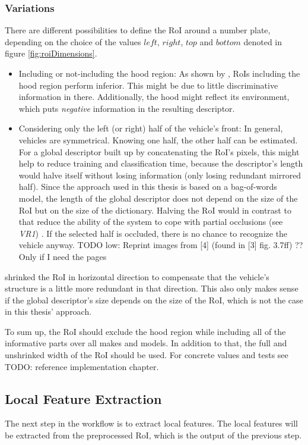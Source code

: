 \subsubsection{Variations}
There are different possibilities to define the RoI around a number plate, depending on the choice of the values $left$, $right$, $top$ and $bottom$ denoted in figure \ref{fig:roiDimensions}.

\begin{itemize}
  \item Including or not-including the hood region: As shown by \citep{hsieh2014symmetrical}, RoIs including the hood region perform inferior. This might be due to little discriminative information in there. Additionally, the hood might reflect its environment, which puts \emph{negative} information in the resulting descriptor.
  \item Considering only the left (or right) half of the vehicle's front: In general, vehicles are symmetrical. Knowing one half, the other half can be estimated. For a global descriptor built up by concatenating the RoI's pixels, this might help to reduce training and classification time, because the descriptor's length would halve itself without losing information (only losing redundant mirrored half). Since the approach used in this thesis is based on a bag-of-words model, the length of the global descriptor does not depend on the size of the RoI but on the size of the dictionary. Halving the RoI would in contrast to that reduce the ability of the system to cope with partial occlusions (see \emph{VR1}) \citep{siddiqui2015robust}. If the selected half is occluded, there is no chance to recognize the vehicle anyway. TODO low: Reprint images from [4] (found in [3] fig. 3.7ff) ?? Only if I need the pages
\end{itemize}
\citeauthor{petrovic2004analysis} \citep{petrovic2004analysis} shrinked the RoI in horizontal direction to compensate that the vehicle's structure is a little more redundant in that direction. This also only makes sense if the global descriptor's size depends on the size of the RoI, which is not the case in this thesis' approach.

To sum up, the RoI should exclude the hood region while including all of the informative parts over all makes and models. In addition to that, the full and unshrinked width of the RoI should be used. For concrete values and tests see TODO: reference implementation chapter.

\subsection{Local Feature Extraction}\label{sec:localFeatureExtractionConcept}
The next step in the workflow is to extract local features. The local features will be extracted from the preprocessed RoI, which is the output of the previous step.

